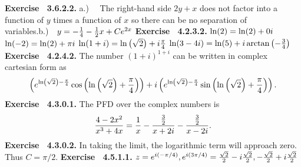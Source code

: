  {\noindent \protect \bf  Exercise ~3.6.2.2.} a.)~~ The right-hand side $2y+x$ does not factor into a function of $y$ times a function of $x$ so there can be no separation of variables.\protect \newline  b.)~~$y = -\protect \frac  {1}{4} -\protect \frac  {1}{2}x +Ce^{2x}$ \protect \newline   \protect \newline  \protect \newline  
 {\noindent \protect \bf  Exercise ~4.2.3.2.} \textbullet $\protect \qopname  \relax o{ln}(2)=\protect \qopname  \relax o{ln}(2)+0i$ \textbullet $\protect \qopname  \relax o{ln}(-2)=\protect \qopname  \relax o{ln}(2)+\pi i$ \textbullet $\protect \qopname  \relax o{ln}(1+i)=\protect \qopname  \relax o{ln}\left (\protect \sqrt  {2}\right )+i\protect \frac  {\pi }{4}$ \textbullet $\protect \qopname  \relax o{ln}(3-4i)=\protect \qopname  \relax o{ln}(5)+i\protect \qopname  \relax o{arctan}\left (-\protect \frac  {3}{4}\right )$ \protect \newline  \protect \newline  
 {\noindent \protect \bf  Exercise ~4.2.4.2.} The number $(1+i)^{1+i}$ can be written in complex cartesian form as $$\left (e^{\protect \qopname  \relax o{ln}\left (\protect \sqrt  {2}\right )-\protect \frac  {\pi }{4}}\protect \qopname  \relax o{cos}\left (\protect \qopname  \relax o{ln}\left (\protect \sqrt  {2}\right )+\protect \frac  {\pi }{4} \right )\right )+i\left (e^{\protect \qopname  \relax o{ln}\left (\protect \sqrt  {2}\right )-\protect \frac  {\pi }{4}}\protect \qopname  \relax o{sin}\left (\protect \qopname  \relax o{ln}\left (\protect \sqrt  {2}\right )+\protect \frac  {\pi }{4} \right )\right ). $$ \protect \newline  \protect \newline  
 {\noindent \protect \bf  Exercise ~4.3.0.1.} The PFD over the complex numbers is $$\protect \frac  {4-2x^2}{x^3+4x}=\protect \frac  {1}{x}-\protect \frac  {\protect \frac  {3}{2}}{x+2i}-\protect \frac  {\protect \frac  {3}{2}}{x-2i}. $$ \protect \newline  \protect \newline  
 {\noindent \protect \bf  Exercise ~4.3.0.2.} In taking the limit, the logarithmic term will approach zero. Thus $C=\pi /2$. \protect \newline  \protect \newline  
 {\noindent \protect \bf  Exercise ~4.5.1.1.} $z=e^{i (-\pi /4)}, e^{i(3 \pi /4)} = \protect \frac  {\protect \sqrt  {2}}{2} - i \protect \frac  {\protect \sqrt  {2}}{2},-\protect \frac  {\protect \sqrt  {2}}{2} + i \protect \frac  {\protect \sqrt  {2}}{2}$  \protect \newline  \protect \newline  
